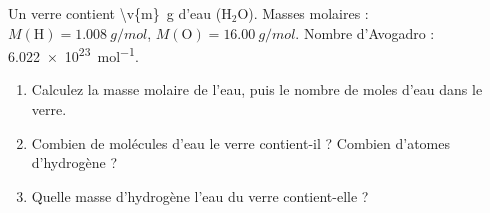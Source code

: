 Un verre contient \qty{\v{m}}{g} d'eau (H$_2$O). Masses molaires : $M(\text{H}) = \qty{1.008}{g/mol}$, $M(\text{O}) = \qty{16.00}{g/mol}$. Nombre d'Avogadro : \qty{6.022e23}{mol^{-1}}.

\begin{enumerate}[label=\alph*)]
    \item Calculez la masse molaire de l'eau, puis le nombre de moles d'eau dans le verre.
    \item Combien de molécules d'eau le verre contient-il ? Combien d'atomes d'hydrogène ?
    \item Quelle masse d'hydrogène l'eau du verre contient-elle ?
\end{enumerate}
